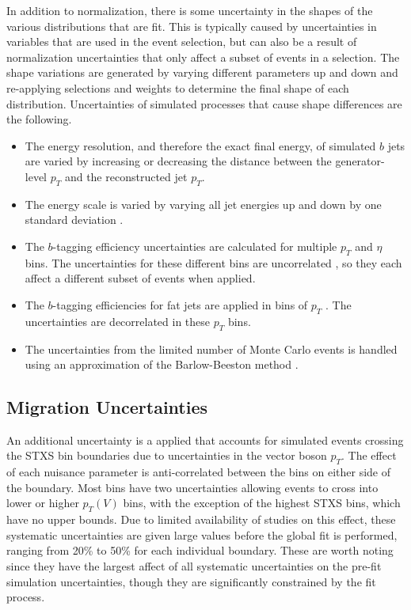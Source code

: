 In addition to normalization, there is some uncertainty in the shapes of the various distributions that are fit.
This is typically caused by uncertainties in variables that are used in the event selection,
but can also be a result of normalization uncertainties that only affect a subset of events in a selection.
The shape variations are generated by varying different parameters up and down
and re-applying selections and weights to determine the final shape of each distribution.
Uncertainties of simulated processes that cause shape differences are the following.
\begin{itemize}
\item The energy resolution, and therefore the exact final energy,
  of simulated $b$ jets are varied by increasing or decreasing
  the distance between the generator-level $p_T$ and the reconstructed jet $p_T$.
\item The energy scale is varied by varying all jet energies up and down by
  one standard deviation \cite{Khachatryan_2017}.
\item The $b$-tagging efficiency uncertainties are calculated
  for multiple $p_T$ and $\eta$ bins.
  The uncertainties for these different bins are uncorrelated \cite{btagsys},
  so they each affect a different subset of events when applied.
\item The $b$-tagging efficiencies for fat jets are applied in bins of $p_T$ \cite{CMS-DP-2018-046}.
  The uncertainties are decorrelated in these $p_T$ bins.
\item The uncertainties from the limited number of Monte Carlo events is handled
  using an approximation of the Barlow-Beeston method \cite{BARLOW1993219}.
\end{itemize}

\subsection{Migration Uncertainties}

An additional uncertainty is a applied that accounts for simulated events crossing the STXS bin boundaries
due to uncertainties in the vector boson $p_T$.
The effect of each nuisance parameter is anti-correlated between the bins on either side of the boundary.
Most bins have two uncertainties allowing events to cross into lower or higher $p_T(V)$ bins,
with the exception of the highest STXS bins, which have no upper bounds.
Due to limited availability of studies on this effect,
these systematic uncertainties are given large values before the global fit is performed,
ranging from 20\% to 50\% for each individual boundary.
These are worth noting since they have the largest affect of all systematic uncertainties
on the pre-fit simulation uncertainties,
though they are significantly constrained by the fit process.
